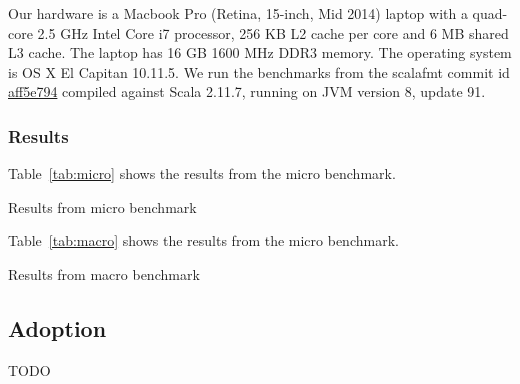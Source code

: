 Our hardware is a Macbook Pro (Retina, 15-inch, Mid 2014) laptop with a quad-core 2.5 GHz Intel Core i7 processor, 256 KB L2 cache per core and 6 MB shared L3 cache.
The laptop has 16 GB 1600 MHz DDR3 memory.
The operating system is OS X El Capitan 10.11.5.
We run the benchmarks from the scalafmt commit id \href{https://github.com/olafurpg/scalafmt/tree/aff5e794dae4787b08243f8abb87a3ca4d907e40}{aff5e794} compiled against Scala 2.11.7, running on JVM version 8, update 91.

\subsubsection{Results}
Table~\ref{tab:micro} shows the results from the micro benchmark.
\begin{table}\label{tab:micro}
  \centering
  \caption{Results from micro benchmark}
\end{table}

Table~\ref{tab:macro} shows the results from the micro benchmark.
\begin{table}[H]
  \centering
  \caption{Results from macro benchmark}\label{tab:macro}
\end{table}



\subsection{Adoption}\label{sec:adoption}
TODO


